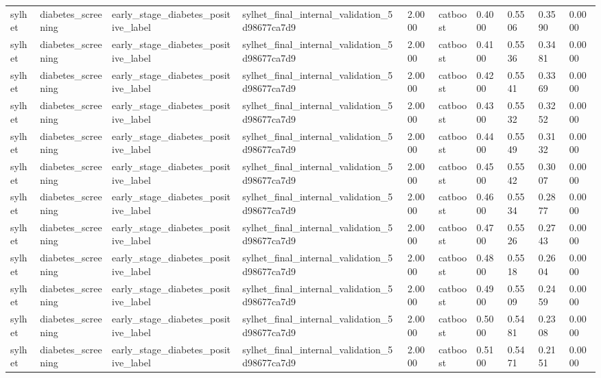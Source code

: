 \begin{tabular}{llllllllll}
sylhet & diabetes\_screening & early\_stage\_diabetes\_positive\_label & sylhet\_final\_internal\_validation\_5d98677ca7d9 & 2.0000 & catboost & 0.4000 & 0.5506 & 0.3590 & 0.0000 \\
sylhet & diabetes\_screening & early\_stage\_diabetes\_positive\_label & sylhet\_final\_internal\_validation\_5d98677ca7d9 & 2.0000 & catboost & 0.4100 & 0.5536 & 0.3481 & 0.0000 \\
sylhet & diabetes\_screening & early\_stage\_diabetes\_positive\_label & sylhet\_final\_internal\_validation\_5d98677ca7d9 & 2.0000 & catboost & 0.4200 & 0.5541 & 0.3369 & 0.0000 \\
sylhet & diabetes\_screening & early\_stage\_diabetes\_positive\_label & sylhet\_final\_internal\_validation\_5d98677ca7d9 & 2.0000 & catboost & 0.4300 & 0.5532 & 0.3252 & 0.0000 \\
sylhet & diabetes\_screening & early\_stage\_diabetes\_positive\_label & sylhet\_final\_internal\_validation\_5d98677ca7d9 & 2.0000 & catboost & 0.4400 & 0.5549 & 0.3132 & 0.0000 \\
sylhet & diabetes\_screening & early\_stage\_diabetes\_positive\_label & sylhet\_final\_internal\_validation\_5d98677ca7d9 & 2.0000 & catboost & 0.4500 & 0.5542 & 0.3007 & 0.0000 \\
sylhet & diabetes\_screening & early\_stage\_diabetes\_positive\_label & sylhet\_final\_internal\_validation\_5d98677ca7d9 & 2.0000 & catboost & 0.4600 & 0.5534 & 0.2877 & 0.0000 \\
sylhet & diabetes\_screening & early\_stage\_diabetes\_positive\_label & sylhet\_final\_internal\_validation\_5d98677ca7d9 & 2.0000 & catboost & 0.4700 & 0.5526 & 0.2743 & 0.0000 \\
sylhet & diabetes\_screening & early\_stage\_diabetes\_positive\_label & sylhet\_final\_internal\_validation\_5d98677ca7d9 & 2.0000 & catboost & 0.4800 & 0.5518 & 0.2604 & 0.0000 \\
sylhet & diabetes\_screening & early\_stage\_diabetes\_positive\_label & sylhet\_final\_internal\_validation\_5d98677ca7d9 & 2.0000 & catboost & 0.4900 & 0.5509 & 0.2459 & 0.0000 \\
sylhet & diabetes\_screening & early\_stage\_diabetes\_positive\_label & sylhet\_final\_internal\_validation\_5d98677ca7d9 & 2.0000 & catboost & 0.5000 & 0.5481 & 0.2308 & 0.0000 \\
sylhet & diabetes\_screening & early\_stage\_diabetes\_positive\_label & sylhet\_final\_internal\_validation\_5d98677ca7d9 & 2.0000 & catboost & 0.5100 & 0.5471 & 0.2151 & 0.0000 \\

\end{tabular}
